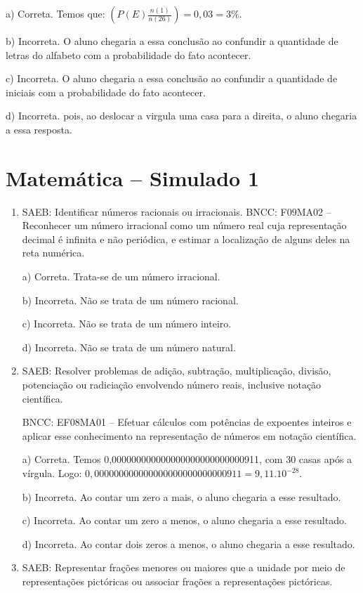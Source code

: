 \begin{enumerate}
a) Correta. Temos que: $(P(E)\frac{n(1)}{n(26)}) = 0,03 = 3\%$.

b) Incorreta. O aluno chegaria a essa conclusão ao confundir a
quantidade de letras do alfabeto com a probabilidade do fato acontecer.

c) Incorreta. O aluno chegaria a essa conclusão ao confundir a
quantidade de iniciais com a probabilidade do fato acontecer.

d) Incorreta. pois, ao deslocar a virgula uma casa para a direita, o
aluno chegaria a essa resposta.
\end{enumerate}


\section*{Matemática – Simulado 1}
\begin{enumerate}
\item SAEB: Identificar números racionais ou irracionais. BNCC: F09MA02 --
Reconhecer um número irracional como um número real cuja representação
decimal é infinita e não periódica, e estimar a localização de alguns
deles na reta numérica.

a) Correta. Trata-se de um número irracional.

b) Incorreta. Não se trata de um número racional.

c) Incorreta. Não se trata de um número inteiro.

d) Incorreta. Não se trata de um número natural.
\item SAEB: Resolver problemas de adição, subtração, multiplicação, divisão,
potenciação ou radiciação envolvendo número reais, inclusive notação
científica.

BNCC: EF08MA01 -- Efetuar cálculos com potências de expoentes inteiros e
aplicar esse conhecimento na representação de números em notação
científica.

a) Correta. Temos 0,000000000000000000000000000911, com 30 casas após a vírgula.
Logo: $0,000000000000000000000000000911 = 9,11 . 10^{-28}$.

b) Incorreta. Ao contar um zero a mais, o aluno chegaria a
esse resultado.

c) Incorreta. Ao contar um zero a menos, o aluno chegaria a
esse resultado.

d) Incorreta. Ao contar dois zeros a menos, o aluno chegaria a
esse resultado.
\item SAEB: Representar frações menores ou maiores que a unidade por meio de
representações pictóricas ou associar frações a representações
pictóricas.


\end{enumerate}
